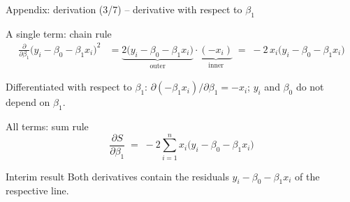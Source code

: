 \documentclass[aspectratio=169,11pt]{beamer}
\begin{document}
\begin{frame}{Appendix: derivation (3/7) -- derivative with respect to $\beta_1$}
  \begin{block}{A single term: chain rule}
    \begin{align*}
      \frac{\partial}{\partial \beta_1}\bigl(y_i - \beta_0 - \beta_1 x_i\bigr)^{2}
        &= \underbrace{2\bigl(y_i - \beta_0 - \beta_1 x_i\bigr)}_{\text{outer}}
           \cdot \underbrace{(-x_i)}_{\text{inner}}
         \;=\; -2\,x_i\bigl(y_i - \beta_0 - \beta_1 x_i\bigr)
    \end{align*}
    \vspace{-10pt}

    \footnotesize Differentiated with respect to $\beta_1$:
    $\partial(-\beta_1 x_i)/\partial \beta_1 = -x_i$; $y_i$ and $\beta_0$ do
    not depend on $\beta_1$.
  \end{block}

  \smallskip

  \begin{block}{All terms: sum rule}
    \[
      \frac{\partial S}{\partial \beta_1}
      \;=\; -2\sum_{i=1}^{n} x_i\bigl(y_i - \beta_0 - \beta_1 x_i\bigr)
    \]
    \vspace{-8pt}
  \end{block}

  \smallskip

  \begin{exampleblock}{Interim result}
    Both derivatives contain the residuals $y_i - \beta_0 - \beta_1 x_i$ of
    the respective line.
  \end{exampleblock}
\end{frame}
\end{document}
